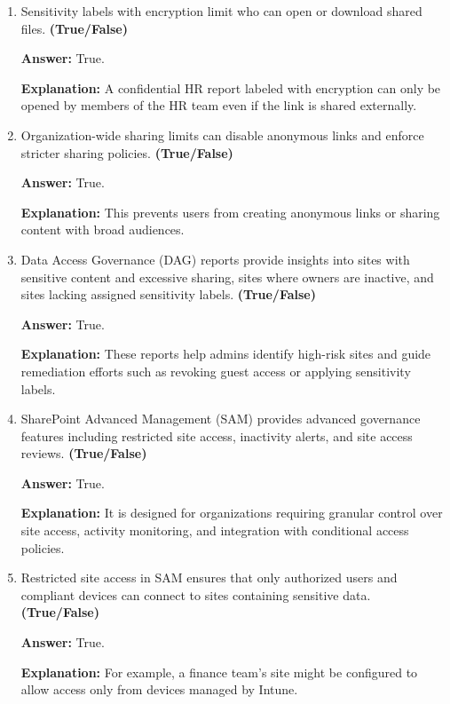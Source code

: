 \documentclass[10pt]{article}
\begin{document}
\begin{enumerate}[leftmargin=*]
\textbf{Answer:} True.

\textbf{Explanation:} Automated scripts and alerts help detect high-risk sharing and ensure timely intervention.

\item Sensitivity labels with encryption limit who can open or download shared files. \textbf{(True/False)}

\textbf{Answer:} True.

\textbf{Explanation:} A confidential HR report labeled with encryption can only be opened by members of the HR team even if the link is shared externally.

\item Organization-wide sharing limits can disable anonymous links and enforce stricter sharing policies. \textbf{(True/False)}

\textbf{Answer:} True.

\textbf{Explanation:} This prevents users from creating anonymous links or sharing content with broad audiences.

\item Data Access Governance (DAG) reports provide insights into sites with sensitive content and excessive sharing, sites where owners are inactive, and sites lacking assigned sensitivity labels. \textbf{(True/False)}

\textbf{Answer:} True.

\textbf{Explanation:} These reports help admins identify high-risk sites and guide remediation efforts such as revoking guest access or applying sensitivity labels.

\item SharePoint Advanced Management (SAM) provides advanced governance features including restricted site access, inactivity alerts, and site access reviews. \textbf{(True/False)}

\textbf{Answer:} True.

\textbf{Explanation:} It is designed for organizations requiring granular control over site access, activity monitoring, and integration with conditional access policies.

\item Restricted site access in SAM ensures that only authorized users and compliant devices can connect to sites containing sensitive data. \textbf{(True/False)}

\textbf{Answer:} True.

\textbf{Explanation:} For example, a finance team’s site might be configured to allow access only from devices managed by Intune.


\end{enumerate}
\end{document}
